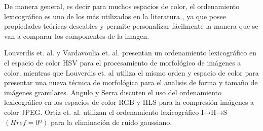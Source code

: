 

De manera general, es decir para muchos espacios de color, el ordenamiento lexicogr\'afico es  uno de los m\'as utilizados en la literatura \cite{aptoula2007comparative, aptoula2008lexicographical}, ya que posee propiedades te\'oricas deseables y permite personalizar f\'acilmente la manera que se van a comparar los componentes de la imagen. 

Louverdis et. al. \cite{louverdis2002new} y  Vardavoulia et. al. \cite{vardavoulia2002vector} presentan un ordenamiento lexicográfico en el espacio de color HSV para el procesamiento de morfológico de imágenes a color, mientras que Louverdis et. al \cite{louverdis2002morphological} utiliza el mismo orden y espacio de color para presentar una nueva técnica de morfológica para el analisis de forma y tamaño de imágenes granulares. Angulo y Serra \cite{angulo2003morphological} discuten el uso del ordenamiento lexicográfico en los espacios de color RGB y HLS para la compresión imágenes a color JPEG. Ortiz et. al. \cite{ortiz2004gaussian}  utilizan el ordenamiento lexicográfico I→H→S $(Href=0º)$ para la eliminación de ruido gaussiano. 



